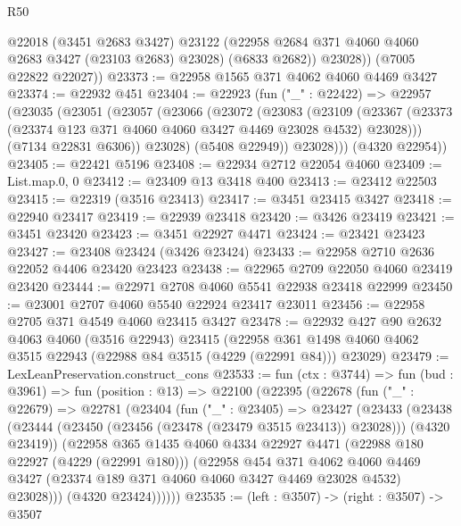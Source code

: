 \begin{lexlean}{R50}
\begin{coremodule}
            @22018
            (@3451 @2683 @3427)
            @23122
            (@22958 @2684 @371 @4060 @4060 @2683 @3427 (@23103 @2683) @23028)
            (@6833 @2682))
          @23028))
      (@7005 @22822 @22027))
@23373 := @22958 @1565 @371 @4062 @4060 @4469 @3427
@23374 := @22932 @451
@23404 := @22923
    (fun ("_" : @22422) =>
    @22957
      (@23035
        (@23051
          (@23057
            (@23066
              (@23072
                (@23083
                  (@23109
                    (@23367
                      (@23373 (@23374 @123 @371 @4060 @4060 @3427 @4469 @23028 @4532) @23028)))
                  (@7134 @22831 @6306))
                @23028)
              (@5408 @22949))
            @23028)))
      (@4320 @22954))
@23405 := @22421 @5196
@23408 := @22934 @2712 @22054 @4060
@23409 := List.map.{0, 0}
@23412 := @23409 @13 @3418 @400
@23413 := @23412 @22503
@23415 := @22319 (@3516 @23413)
@23417 := @3451 @23415 @3427
@23418 := @22940 @23417
@23419 := @22939 @23418
@23420 := @3426 @23419
@23421 := @3451 @23420
@23423 := @3451 @22927 @4471
@23424 := @23421 @23423
@23427 := @23408 @23424 (@3426 @23424)
@23433 := @22958 @2710 @2636 @22052 @4406 @23420 @23423
@23438 := @22965 @2709 @22050 @4060 @23419 @23420
@23444 := @22971 @2708 @4060 @5541 @22938 @23418 @22999
@23450 := @23001 @2707 @4060 @5540 @22924 @23417 @23011
@23456 := @22958 @2705 @371 @4549 @4060 @23415 @3427
@23478 := @22932
    @427
    @90
    @2632
    @4063
    @4060
    (@3516 @22943)
    @23415
    (@22958 @361 @1498 @4060 @4062 @3515 @22943 (@22988 @84 @3515 (@4229 (@22991 @84))) @23029)
@23479 := LexLeanPreservation.construct_cons
@23533 := fun (ctx : @3744) =>
  fun (bud : @3961) =>
  fun (position : @13) =>
  @22100
    (@22395
      (@22678
        (fun ("_" : @22679) =>
        @22781
          (@23404
            (fun ("_" : @23405) =>
            @23427
              (@23433
                (@23438
                  (@23444 (@23450 (@23456 (@23478 (@23479 @3515 @23413)) @23028)))
                  (@4320 @23419))
                (@22958
                  @365
                  @1435
                  @4060
                  @4334
                  @22927
                  @4471
                  (@22988 @180 @22927 (@4229 (@22991 @180)))
                  (@22958
                    @454
                    @371
                    @4062
                    @4060
                    @4469
                    @3427
                    (@23374 @189 @371 @4060 @4060 @3427 @4469 @23028 @4532)
                    @23028)))
              (@4320 @23424))))))
@23535 := (left : @3507) -> (right : @3507) -> @3507

\end{coremodule}
\end{lexlean}
